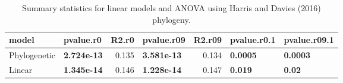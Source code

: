 \documentclass[]{article}
\begin{document}
\begin{table}[H]

\caption{\label{tab:unnamed-chunk-43}Summary statistics for linear models and ANOVA using Harris and Davies (2016) phylogeny.}
\centering
\begin{tabular}{l|l|r|l|r|l|l}
\hline
model & pvalue.r0 & R2.r0 & pvalue.r09 & R2.r09 & pvalue.r0.1 & pvalue.r09.1\\
\hline
Phylogenetic & \textbf{2.724e-13} & 0.135 & \textbf{3.581e-13} & 0.134 & \textbf{0.0005} & \textbf{0.0003}\\
\hline
Linear & \textbf{1.345e-14} & 0.146 & \textbf{1.228e-14} & 0.147 & \textbf{0.019} & \textbf{0.02}\\
\hline
\end{tabular}
\end{table}
\end{document}
